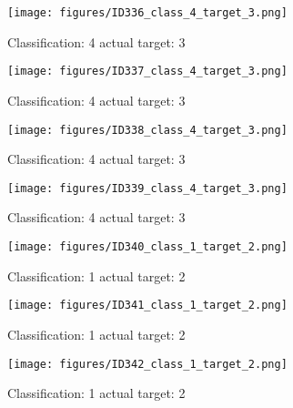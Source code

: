 \begin{figure}[h!]
\begin{center}
\texttt{[image: figures/ID336\_class\_4\_target\_3.png]}
\end{center}
\caption{ Classification: 4 actual target: 3}
\label{fig:ID336_class_4_target_3}
\end{figure}
\begin{figure}[h!]
\begin{center}
\texttt{[image: figures/ID337\_class\_4\_target\_3.png]}
\end{center}
\caption{ Classification: 4 actual target: 3}
\label{fig:ID337_class_4_target_3}
\end{figure}
\begin{figure}[h!]
\begin{center}
\texttt{[image: figures/ID338\_class\_4\_target\_3.png]}
\end{center}
\caption{ Classification: 4 actual target: 3}
\label{fig:ID338_class_4_target_3}
\end{figure}
\begin{figure}[h!]
\begin{center}
\texttt{[image: figures/ID339\_class\_4\_target\_3.png]}
\end{center}
\caption{ Classification: 4 actual target: 3}
\label{fig:ID339_class_4_target_3}
\end{figure}
\begin{figure}[h!]
\begin{center}
\texttt{[image: figures/ID340\_class\_1\_target\_2.png]}
\end{center}
\caption{ Classification: 1 actual target: 2}
\label{fig:ID340_class_1_target_2}
\end{figure}
\begin{figure}[h!]
\begin{center}
\texttt{[image: figures/ID341\_class\_1\_target\_2.png]}
\end{center}
\caption{ Classification: 1 actual target: 2}
\label{fig:ID341_class_1_target_2}
\end{figure}
\begin{figure}[h!]
\begin{center}
\texttt{[image: figures/ID342\_class\_1\_target\_2.png]}
\end{center}
\caption{ Classification: 1 actual target: 2}
\label{fig:ID342_class_1_target_2}
\end{figure}
